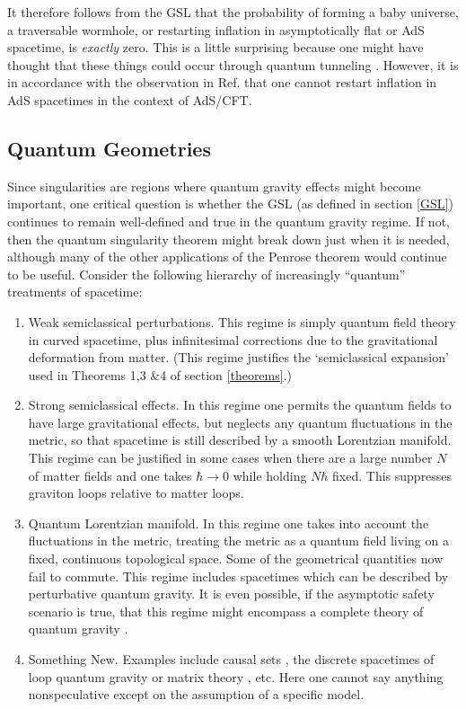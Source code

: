 \documentclass{article}
\begin{document}
It therefore follows from the GSL that the probability of forming a baby universe, a traversable wormhole, or restarting inflation in asymptotically flat or AdS spacetime, is \emph{exactly} zero.  This is a little surprising because one might have thought that these things could occur through quantum tunneling \cite{bubble, monopole}.  However, it is in accordance with the observation in Ref. \cite{myers} that one cannot restart inflation in AdS spacetimes in the context of AdS/CFT.

\subsection{Quantum Geometries}\label{quantgeo}

Since singularities are regions where quantum gravity effects might become important, one critical question is whether the GSL (as defined in section \ref{GSL}) continues to remain well-defined and true in the quantum gravity regime.  If not, then the quantum singularity theorem might break down just when it is needed, although many of the other applications of the Penrose theorem would continue to be useful.  Consider the following hierarchy of increasingly ``quantum'' treatments of spacetime:
\begin{enumerate}
\item Weak semiclassical perturbations.  This regime is simply quantum field theory in curved spacetime, plus infinitesimal corrections due to the gravitational deformation from matter.  (This regime justifies the `semiclassical expansion' used in Theorems 1,3 \&4 of section \ref{theorems}.)

\item Strong semiclassical effects.  In this regime one permits the quantum fields to have large gravitational effects, but neglects any quantum fluctuations in the metric, so that spacetime is still described by a smooth Lorentzian manifold.  This regime can be justified in some cases when there are a large number $N$ of matter fields and one takes $\hbar \to 0$ while holding $N\hbar$ fixed.  This suppresses graviton loops relative to matter loops.

\item Quantum Lorentzian manifold.  In this regime one takes into account the fluctuations in the metric, treating the metric as a quantum field living on a fixed, continuous topological space.  Some of the geometrical quantities now fail to commute.  This regime includes spacetimes which can be described by perturbative quantum gravity.  It is even possible, if the asymptotic safety scenario is true, that this regime might encompass a complete theory of quantum gravity \cite{safety}.

\item Something New.  Examples include causal sets \cite{causal}, the discrete spacetimes of loop quantum gravity \cite{lqg} or matrix theory \cite{matrix}, etc.  Here one cannot say anything nonspeculative except on the assumption of a specific model.
\end{enumerate}
\end{document}
